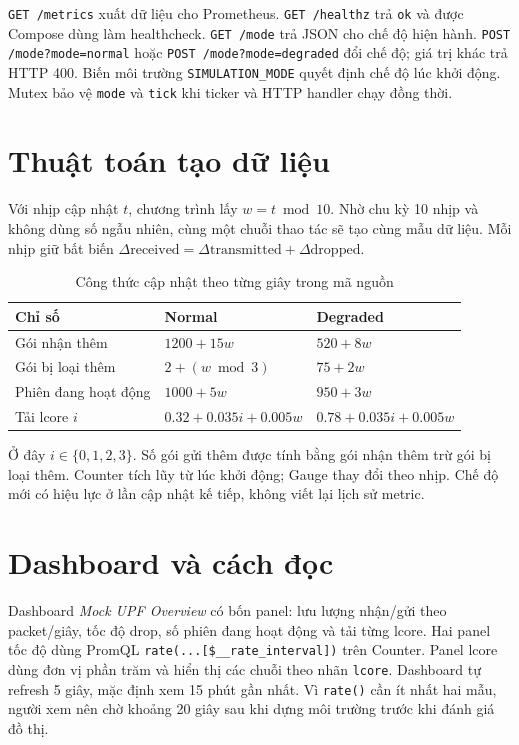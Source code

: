\documentclass[12pt,a4paper]{report}
\newcommand{\code}[1]{\texttt{#1}}
\begin{document}
\code{GET /metrics} xuất dữ liệu cho Prometheus. \code{GET /healthz} trả \code{ok} và được Compose dùng làm healthcheck. \code{GET /mode} trả JSON cho chế độ hiện hành. \code{POST /mode?mode=normal} hoặc \code{POST /mode?mode=degraded} đổi chế độ; giá trị khác trả HTTP 400. Biến môi trường \code{SIMULATION\_MODE} quyết định chế độ lúc khởi động. Mutex bảo vệ \code{mode} và \code{tick} khi ticker và HTTP handler chạy đồng thời.

\section{Thuật toán tạo dữ liệu}
Với nhịp cập nhật \(t\), chương trình lấy \(w=t\bmod 10\). Nhờ chu kỳ 10 nhịp và không dùng số ngẫu nhiên, cùng một chuỗi thao tác sẽ tạo cùng mẫu dữ liệu. Mỗi nhịp giữ bất biến \(\Delta\mathrm{received}=\Delta\mathrm{transmitted}+\Delta\mathrm{dropped}\).

\begin{table}[H]
\centering\small
\caption{Công thức cập nhật theo từng giây trong mã nguồn}
\begin{tabularx}{\textwidth}{p{3.5cm}Y Y}
\toprule
\textbf{Chỉ số} & \textbf{Normal} & \textbf{Degraded} \\
\midrule
Gói nhận thêm & \(1200+15w\) & \(520+8w\) \\
Gói bị loại thêm & \(2+(w\bmod 3)\) & \(75+2w\) \\
Phiên đang hoạt động & \(1000+5w\) & \(950+3w\) \\
Tải lcore \(i\) & \(0.32+0.035i+0.005w\) & \(0.78+0.035i+0.005w\) \\
\bottomrule
\end{tabularx}
\end{table}
Ở đây \(i\in\{0,1,2,3\}\). Số gói gửi thêm được tính bằng gói nhận thêm trừ gói bị loại thêm. Counter tích lũy từ lúc khởi động; Gauge thay đổi theo nhịp. Chế độ mới có hiệu lực ở lần cập nhật kế tiếp, không viết lại lịch sử metric.

\section{Dashboard và cách đọc}
Dashboard \emph{Mock UPF Overview} có bốn panel: lưu lượng nhận/gửi theo packet/giây, tốc độ drop, số phiên đang hoạt động và tải từng lcore. Hai panel tốc độ dùng PromQL \code{rate(...[\$\_\_rate\_interval])} trên Counter. Panel lcore dùng đơn vị phần trăm và hiển thị các chuỗi theo nhãn \code{lcore}. Dashboard tự refresh 5 giây, mặc định xem 15 phút gần nhất. Vì \code{rate()} cần ít nhất hai mẫu, người xem nên chờ khoảng 20 giây sau khi dựng môi trường trước khi đánh giá đồ thị.
\end{document}
